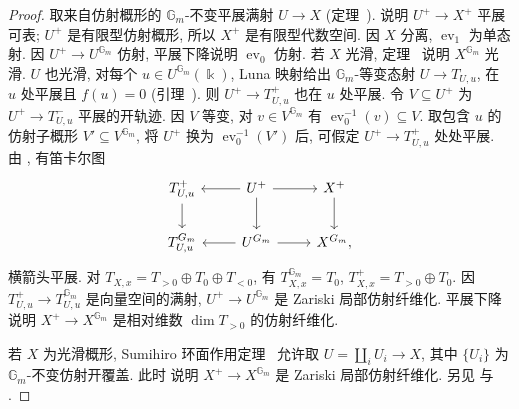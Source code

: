 \begin{proof}
取来自仿射概形的 $\mathbb G_m$-不变平展满射 $U\to X$ (定理~).  说明 $U^+\to X^+$ 平展可表; $U^+$ 是有限型仿射概形, 所以 $X^+$ 是有限型代数空间. 因 $X$ 分离, $\operatorname{ev}_1$ 为单态射. 因 $U^+\to U^{\mathbb G_m}$ 仿射, 平展下降说明 $\operatorname{ev}_0$ 仿射. 若 $X$ 光滑, 定理~ 说明 $X^{\mathbb G_m}$ 光滑. $U$ 也光滑, 对每个 $u\in U^{\mathbb G_m}(\Bbbk)$, Luna 映射给出 $\mathbb G_m$-等变态射 $U\to T_{U,u}$, 在 $u$ 处平展且 $f(u)=0$ (引理~). 则 $U^+\to T_{U,u}^+$ 也在 $u$ 处平展. 令 $V\subseteq U^+$ 为 $U^+\to T_{U,u}^-$ 平展的开轨迹. 因 $V$ 等变, 对 $v\in V^{\mathbb G_m}$ 有 $\operatorname{ev}_0^{-1}(v)\subseteq V$. 取包含 $u$ 的仿射子概形 $V'\subseteq V^{\mathbb G_m}$, 将 $U^+$ 换为 $\operatorname{ev}_0^{-1}(V')$ 后, 可假定 $U^+\to T_{U,u}^+$ 处处平展. 由 , 有笛卡尔图
\begin{align}\label{src:7.8.12}
\begin{tikzcd}[ampersand replacement=\&]
T_{U,u}^+\arrow[d]\&U^+\arrow[l]\arrow[r]\arrow[d]\&X^+\arrow[d]\\
T_{U,u}^{\mathbb G_m}\&U^{\mathbb G_m}\arrow[l]\arrow[r]\&X^{\mathbb G_m},
\end{tikzcd}
\end{align}
横箭头平展. 对 $T_{X,x}=T_{>0}\oplus T_0\oplus T_{<0}$, 有 $T_{X,x}^{\mathbb G_m}=T_0$, $T_{X,x}^+=T_{>0}\oplus T_0$. 因 $T_{U,u}^+\to T_{U,u}^{\mathbb G_m}$ 是向量空间的满射, $U^+\to U^{\mathbb G_m}$ 是 Zariski 局部仿射纤维化. 平展下降说明 $X^+\to X^{\mathbb G_m}$ 是相对维数 $\dim T_{>0}$ 的仿射纤维化.

若 $X$ 为光滑概形, Sumihiro 环面作用定理~ 允许取 $U=\coprod_iU_i\to X$, 其中 $\{U_i\}$ 为 $\mathbb G_m$-不变仿射开覆盖. 此时  说明 $X^+\to X^{\mathbb G_m}$ 是 Zariski 局部仿射纤维化. 另见 \cite[命题 1.2.2, 定理 1.4.2]{Dri13} 与 \cite[定理 5.16]{AHR20}.
\end{proof}
